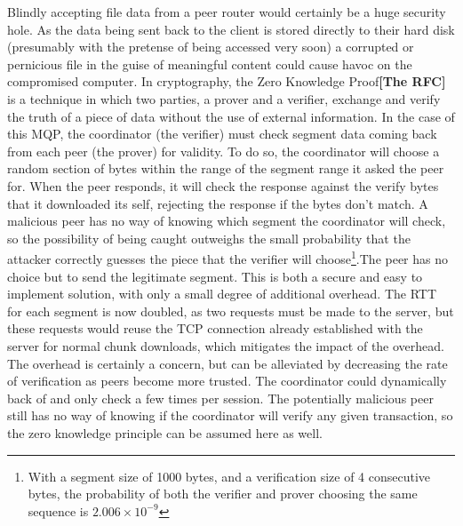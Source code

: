 \documentclass[12pt]{article}
\newcommand{\lcite}[1]
{{\bfseries\color{orange}[#1]}}
\begin{document}
		Blindly accepting file data from a peer router would certainly be a huge security hole. As the data being sent back to the client is stored directly to their hard disk (presumably with the pretense of being accessed very soon) a corrupted or pernicious file in the guise of meaningful content could cause havoc on the compromised computer. In cryptography, the Zero Knowledge Proof\lcite{The RFC} is a technique in which two parties, a prover and a verifier, exchange and verify the truth of a piece of data without the use of external information. In the case of this MQP, the coordinator (the verifier) must check segment data coming back from each peer (the prover) for validity. To do so, the coordinator will choose a random section of bytes within the range of the segment range it asked the peer for. When the peer responds, it will check the response against the verify bytes that it downloaded its self, rejecting the response if the bytes don't match. A malicious peer has no way of knowing which segment the coordinator will check, so the possibility of being caught outweighs the small probability that the attacker correctly guesses the piece that the verifier will choose\footnote{With a segment size of 1000 bytes, and a verification size of 4 consecutive bytes, the probability of both the verifier and prover choosing the same sequence is $2.006\times10^{-9}$}.The peer has no choice but to send the legitimate segment. This is both a secure and easy to implement solution, with only a small degree of additional overhead. The RTT for each segment is now doubled, as two requests must be made to the server, but these requests would reuse the TCP connection already established with the server for normal chunk downloads, which mitigates the impact of the overhead. The overhead is certainly a concern, but can be alleviated by decreasing the rate of verification as peers become more trusted. The coordinator could dynamically back of and only check a few times per session. The potentially malicious peer still has no way of knowing if the coordinator will verify any given transaction, so the zero knowledge principle can be assumed here as well. 
\end{document}
